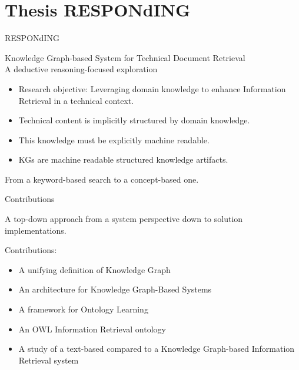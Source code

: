 \section{Thesis RESPONdING}

\begin{frame}{RESPONdING}
    \begin{center}
        Knowledge Graph-based System for Technical Document Retrieval\\A deductive reasoning-focused exploration
    \end{center}
    
    \begin{itemize}
        \item Research objective: Leveraging domain knowledge to enhance Information Retrieval in a technical context.
        \item Technical content is implicitly structured by domain knowledge.
        \item This knowledge must be explicitly machine readable.
        \item KGs are machine readable structured knowledge artifacts.
    \end{itemize}
    
    \begin{center}
        From a keyword-based search to a concept-based one.
    \end{center}
    
\end{frame}

\begin{frame}{Contributions}

    \begin{center}
        A top-down approach from a system perspective down to solution implementations.
    \end{center}

    Contributions:
    \begin{itemize}
        \item A unifying definition of Knowledge Graph
        \item An architecture for Knowledge Graph-Based Systems
        \item A framework for Ontology Learning
        \item An OWL Information Retrieval ontology
        \item A study of a text-based compared to a Knowledge Graph-based Information Retrieval system
    \end{itemize}
    
\end{frame}

